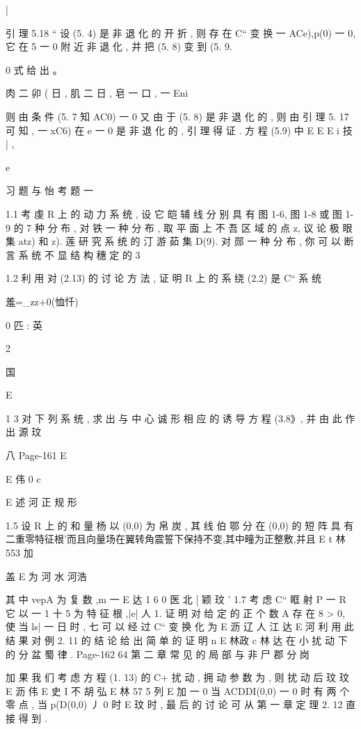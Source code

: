 {{{{{{{{{{{{{{{{{|

引 理 5.18 “ 设 (5. 4) 是 非 退 化 的 开 折 , 则 存 在 C“ 变 换 一
ACe),p(0) 一 0, 它 在 5 一 0 附 近 非 退 化 , 并 把 (5. 8) 变 到 (5. 9.

0
式 给 出 。

肉 二 卯 ( 日 , 肌 二 日 , 皂 一 口 , 一 Eni

则 由 条 件 (5. 7 知 AC0) 一 0 又 由 于 (5. 8) 是 非 退 化 的 , 则 由 引 理
5. 17 可 知 , 一 xC6) 在 e 一 0 是 非 退 化 的 , 引 理 得 证 . 方 程 (5.9) 中
E E
E i 技 | ,

e

习 题 与 怡 考 题 一

1.1 考 虔 R 上 的 动 力 系 统 , 设 它 皑 辅 线 分 别 具 有 图 1-6, 图 1-8 或 图 1-9
的 7 种 分 布 , 对 铁 一 种 分 布 , 取 平 面 上 不 吾 区 域 的 点 z, 议 论 极 眼 集 atz) 和
z). 莲 研 究 系 统 的 汀 游 茹 集 D(9). 对 郧 一 种 分 布 , 你 可 以 断 言 系 统 不 显 结
构 穗 定 的 3

1.2 利 用 对 (2.13) 的 讨 论 方 法 , 证 明 R 上 的 系 绕 (2.2) 是 C“ 系 统

羞=_zz+0(恤忏)

0
匹 :
英

2

国

E

1 3 对 下 列 系 统 , 求 出 与 中 心 诚 形 相 应 的 诱 导 方 程 (3.8》, 并 由 此 作 出 源
玟

八
Page-161
E

E 伟
0
c

E 述 河 正 规 形

1.5 设 R 上 的 和 量 杨 以 (0,0) 为 帛 炭 , 其 线 伯 鄂 分 在 (0,0) 的 短 阵 具 有
二重零特征根'而且向量场在翼转角震誓下保持不变,其中疃为正整敷,并且
E t 林553 加

盖 E 为 河 水 河浩

其 中 vepA 为 复 数 ,m 一
E 达
1 6
0 医 北
[ 颖
玟
' 1.7 考 虑 C“ 眶 射 P 一 R 它 以 一 1 十 5 为 特 征 根 ,|e| 人 1. 证 明 对
给 定 的 正 个 数 A 存 在 8 > 0, 使 当 ls| 一 日 时 , 七 可 以 经 过 C“ 变 换 化 为
E 沥 辽 人 江 达
E 河
利 用 此 结 果 对 例 2. 11 的 结 论 给 出 简 单 的 证 明
n
E 林政 c 林 达
在 小 扰 动 下 的 分 盆 蜀 律 .
Page-162
64 第 二 章 常 见 的 局 部 与 非 尸 郡 分 岗

加 果 我 们 考 虑 方 程 (1. 13) 的 C+ 扰 动 , 拥 动 参 数 为 , 则 扰 动 后
玟
玟
E 沥 伟
E 史 I 不 胡 弘
E 林 57 5 列
E
加 一 0 当 ACDDI(0,0) 一 0 时 有 两 个 零 点 , 当 p(D(0,0) 丿 0 时
E
玟
时 , 最 后 的 讨 论 可 从 第 一 章 定 理 2. 12 直 接 得 到 .

}}}}}}}}}}}}}}}}}
